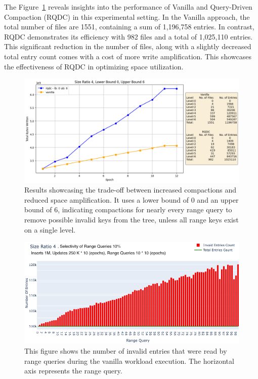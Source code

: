 The Figure~\ref{fig:epoch_experiments} reveals insights into the performance of Vanilla and Query-Driven 
Compaction (RQDC) in this experimental setting. In the Vanilla approach, the total number of files are 1551, containing 
a sum of 1,196,758 entries. In contrast, RQDC demonstrates its efficiency with 982 files and a total of 1,025,110 entries. 
This significant reduction in the number of files, along with a slightly decreased total entry count comes with a cost 
of more write amplification. This showcases the effectiveness of RQDC in optimizing space utilization.

\begin{figure}
    \includegraphics[scale=0.3]{Figures/epoch-experiment-size-ratio-4.png}
    \caption{Results showcasing the trade-off between increased compactions and reduced space amplification. It 
    uses a lower bound of 0 and an upper bound of 6, indicating compactions for nearly every range query to 
    remove possible invalid keys from the tree, unless all range keys exist on a single level.}\label{fig:epoch_experiments}
\end{figure}

\begin{figure}
    \includegraphics[scale=0.28]{Figures/epoch-experiment-size-ratio-4-vanilla.png}
    \caption{This figure shows the number of invalid entries that were read by range queries during the vanilla 
    workload execution. The horizontal axis represents the range query.}\label{fig:increased_invalid_keys}
\end{figure}

